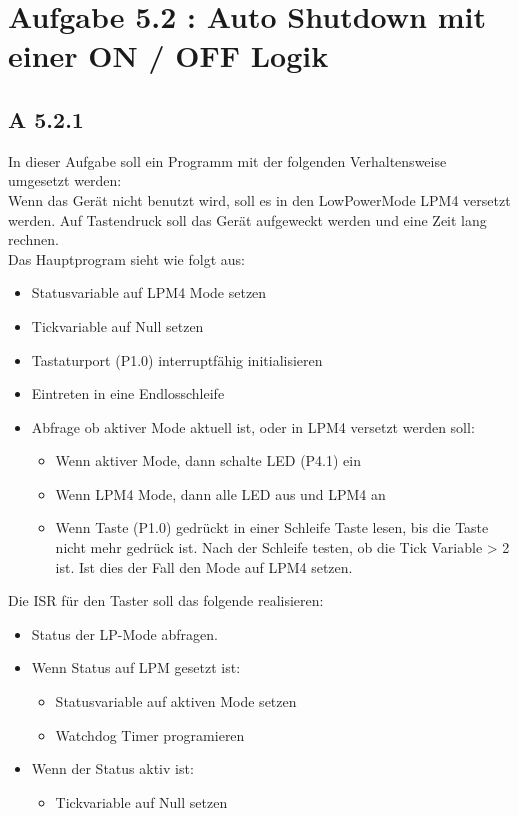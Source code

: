 \section{Aufgabe 5.2 : Auto Shutdown mit einer ON / OFF Logik}

\subsection{A 5.2.1}

In dieser Aufgabe soll ein Programm mit der folgenden Verhaltensweise umgesetzt werden:\\
Wenn das Gerät nicht benutzt wird, soll es in den LowPowerMode LPM4 versetzt werden. Auf Tastendruck soll das Gerät aufgeweckt werden und eine Zeit lang rechnen.\\

Das Hauptprogram sieht wie folgt aus:

\begin{itemize}
	\item Statusvariable auf LPM4 Mode setzen
	\item Tickvariable auf Null setzen
	\item Tastaturport (P1.0) interruptfähig initialisieren
	\item Eintreten in eine Endlosschleife
	\item Abfrage ob aktiver Mode aktuell ist, oder in LPM4 versetzt werden soll:
		\begin{itemize}
			\item Wenn aktiver Mode, dann schalte LED (P4.1) ein
			\item Wenn LPM4 Mode, dann alle LED aus und LPM4 an
			\item Wenn Taste (P1.0) gedrückt in einer Schleife Taste lesen, bis die Taste nicht mehr gedrück ist. Nach der Schleife testen, ob die Tick 	
				Variable > 2 ist. Ist dies der Fall den Mode auf LPM4 setzen.
		\end{itemize}
\end{itemize}	

Die ISR für den Taster soll das folgende realisieren:

\begin{itemize}
	\item Status der LP-Mode abfragen.
	\item Wenn Status auf LPM gesetzt ist:
		\begin{itemize}
			\item  Statusvariable auf aktiven Mode setzen
			\item Watchdog Timer programieren
		\end{itemize}
	\item Wenn der Status aktiv ist:
		\begin{itemize}
			\item Tickvariable auf Null setzen
		\end{itemize}
\end{itemize}

